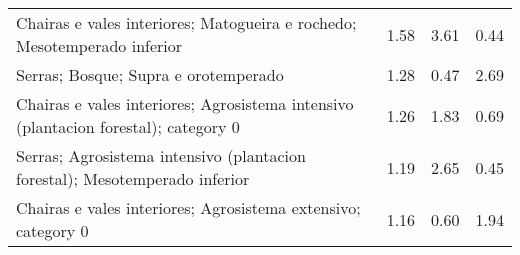 \begin{table}[p]
\begin{tabular}{lrrr}
  Chairas e vales interiores; Matogueira e rochedo; Mesotemperado inferior & 1.58 & 3.61 & 0.44 \\ 
  Serras; Bosque; Supra e orotemperado & 1.28 & 0.47 & 2.69 \\ 
  Chairas e vales interiores; Agrosistema intensivo (plantacion forestal); category 0 & 1.26 & 1.83 & 0.69 \\ 
  Serras; Agrosistema intensivo (plantacion forestal); Mesotemperado inferior & 1.19 & 2.65 & 0.45 \\ 
  Chairas e vales interiores; Agrosistema extensivo; category 0 & 1.16 & 0.60 & 1.94 \\ 
   \hline
\end{tabular}
\end{table}
